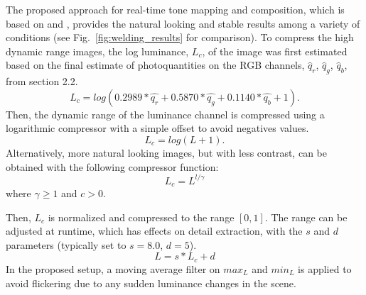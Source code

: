 The proposed approach for real-time tone mapping and composition, which is based on 
\cite{GastalOliveira2011DomainTransform} and \cite{farbman2008edge}, provides the natural looking 
and stable results among a variety of conditions (see Fig.~\ref{fig:welding_results} for comparison).
%
To compress the high dynamic range images, the log luminance, $L_c$, of the image was first 
estimated based on the final estimate of photoquantities on the RGB channels, $\hat{q}_r$, $\hat{q}
_g$, $\hat{q}_b$, from section 2.2.
\begin{equation}
L_c = log(0.2989*\hat{q_r} + 0.5870*\hat{q_g} + 0.1140*\hat{q_b} + 1).
\end{equation}
Then, the dynamic range of the luminance channel is compressed using a logarithmic compressor 
with a simple offset to avoid negatives values.
\begin{equation}
L_c = log(L+1).
\end{equation}
Alternatively, more natural looking images, but with less contrast, can be obtained with the following 
compressor function: 
\begin{equation}\label{lum_equation_2}
L_c = L^{l/\gamma}
\end{equation} where $\gamma \ge 1$ and $c > 0$.

Then, $L_c$ is normalized and compressed to the range $[0,1]$. The range can be adjusted at 
runtime, which has effects on detail extraction, with the $s$ and $d$ parameters (typically set to 
$s=8.0$, $d=5$).
\begin{equation}\label{lum_equation_3}
L = s*L_c+d
\end{equation}
In the proposed setup, a moving average filter on $max_L$ and $min_L$ is applied to avoid flickering 
due to any sudden luminance changes in the scene.

